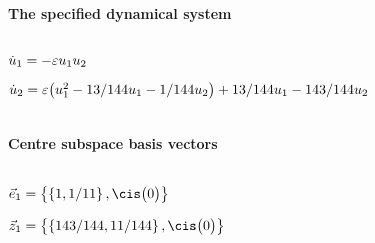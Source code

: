 
\(\)
\paragraph{The specified dynamical system}
\(
\)\par

\(\dot u_{1}=-\varepsilon u\sb1 u\sb2
\)\par

\(\dot u_{2}=\varepsilon \big(u\sb1^{2}-13/144 u\sb1-1/144 u\sb2\big)+13/144 
u\sb1-143/144 u\sb2
\)\par

\(\)
\paragraph{Centre subspace basis vectors}
\(
\)\par

\(\vec e_{1}=\left\{
\left\{
1 , 1/11
\right\} , \cis\big(0\big)
\right\}
\)\par

\(\vec z_{1}=\left\{
\left\{
143/144 , 11/144
\right\} , \cis\big(0\big)
\right\}
\)\par
